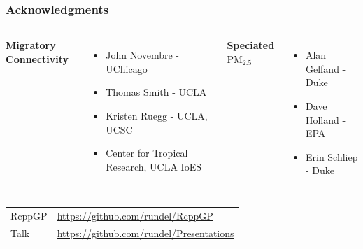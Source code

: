 \documentclass[t]{beamer}\usepackage[]{graphicx}\usepackage[]{color}
\newcommand{\PM}{$\text{PM}_{2.5}$ }
\begin{document}
\begin{frame}
\frametitle{Acknowledgments}

\begin{columns}[t]
\textbf{Migratory Connectivity}
\vspace{5mm}
\begin{itemize}
  \item John Novembre - UChicago
  \vspace{3mm} \item Thomas Smith - UCLA
  \vspace{3mm} \item Kristen Ruegg - UCLA, UCSC
  \vspace{3mm} \item Center for Tropical Research, UCLA IoES
\end{itemize}

\textbf{Speciated \PM}
\vspace{2.5mm}
\begin{itemize}
  \item Alan Gelfand - Duke
  \vspace{3mm} \item Dave Holland - EPA
  \vspace{3mm} \item Erin Schliep - Duke
\end{itemize}
\end{columns}

\vfill

\begin{center}
\begin{tabular}{ll}
RcppGP & \url{https://github.com/rundel/RcppGP} \\ 
Talk & \url{https://github.com/rundel/Presentations}
\end{tabular}
\end{center}

\end{frame}


\appendix


\begin{frame}

\end{frame}

\end{document}
